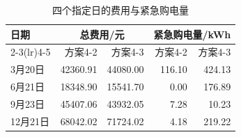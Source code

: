 \begin{table}[H]
\centering\small
\caption{四个指定日的费用与紧急购电量}\label{tab:q4-days}
\begin{tabular}{lrrrr}
\toprule
日期 & \multicolumn{2}{c}{总费用/元} & \multicolumn{2}{c}{紧急购电量/kWh}\\
\cmidrule(lr){2-3}\cmidrule(lr){4-5}
 & 方案4-2 & 方案4-3 & 方案4-2 & 方案4-3\\
\midrule
3月20日 & 42360.91 & 44080.00 & 116.10 & 424.13\\
6月21日 & 18348.90 & 15541.70 & 0.00 & 176.89\\
9月23日 & 45407.06 & 43932.05 & 7.28 & 10.23\\
12月21日 & 68042.02 & 71724.02 & 4.18 & 219.22\\
\bottomrule
\end{tabular}
\end{table}
